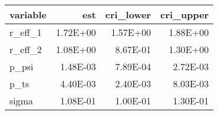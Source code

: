 \begin{table}[ht]
\centering
\begin{tabular}{lrrr}
  \hline
variable & est & cri\_lower & cri\_upper \\ 
  \hline
r\_eff\_1 & 1.72E+00 & 1.57E+00 & 1.88E+00 \\ 
  r\_eff\_2 & 1.08E+00 & 8.67E-01 & 1.30E+00 \\ 
  p\_psi & 1.48E-03 & 7.89E-04 & 2.72E-03 \\ 
  p\_ts & 4.40E-03 & 2.40E-03 & 8.03E-03 \\ 
  sigma & 1.08E-01 & 1.00E-01 & 1.30E-01 \\ 
   \hline
\end{tabular}
\end{table}
